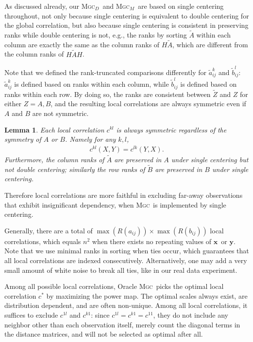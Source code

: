 \documentclass[11pt]{article}
\providecommand{\sct}[1]{{\normalfont\textsc{#1}}}
\providecommand{\mt}[1]{\widetilde{#1}}
\providecommand{\mb}[1]{\boldsymbol{#1}}
\newcommand{\G}{c}
\newcommand{\Mgc}{\sct{Mgc}}
\newcommand{\Mgcd}{\sct{Mgc$_D$}}
\newcommand{\Mgcm}{\sct{Mgc$_M$}}
\newcommand{\mbx}{\ensuremath{\mb{x}}}
\newcommand{\mby}{\ensuremath{\mb{y}}}
\newtheorem{lem}{Lemma}
\begin{document}
As discussed already, our \Mgcd~and \Mgcm~are based on single centering throughout, not only because single centering is equivalent to double centering for the global correlation, but also because single centering is consistent in preserving ranks while double centering is not, e.g., the ranks by sorting $\tilde{A}$ within each column are exactly the same as the column ranks of $H\tilde{A}$, which are different from the column ranks of $H\tilde{A}H$. 

Note that we defined the rank-truncated comparisons differently for $\mt{a}_{ij}^k$ and $\mt{b}_{ij}^l$: $\mt{a}_{ij}^k$ is defined based on ranks within each column, while $\mt{b}_{ij}^l$ is defined based on ranks within each row. By doing so, the ranks are consistent between $\tilde{Z}$ and $Z$ for either $Z=A,B$, and the resulting local correlations are always symmetric even if $A$ and $B$ are not symmetric.

\begin{lem}
Each local correlation $\G^{kl}$ is always symmetric regardless of the symmetry of $A$ or $B$. Namely for any $k,l$, 
\begin{align*}
\G^{kl}(X,Y)=\G^{lk}(Y,X).
\end{align*}
Furthermore, the column ranks of $\tilde{A}$ are preserved in $A$ under single centering but not double centering; similarly the row ranks of $\tilde{B}$ are preserved in $B$ under single centering.
\end{lem}
Therefore local correlations are more faithful in excluding far-away observations that exhibit insignificant dependency, when \Mgc~is implemented by single centering.

Generally, there are a total of $\max(R(a_{ij})) \times \max(R(b_{ij}))$ local correlations, which equals $n^2$ when there exists no repeating values of \mbx~or \mby. Note that we use minimal ranks in sorting when ties occur, which guarantees that all local correlations are indexed consecutively. Alternatively, one may add a very small amount of white noise to break all ties, like in our real data experiment.

Among all possible local correlations, Oracle \Mgc~picks the optimal local correlation $\G^{*}$ by maximizing the power map. The optimal scales always exist,  are distribution dependent, and are often non-unique. Among all local correlations, it suffices to exclude $\G^{1l}$ and $\G^{k1}$: since $\G^{1l}=\G^{k1}=\G^{11}$, they do not include any neighbor other than each observation itself, merely count the diagonal terms in the distance matrices, and will not be selected as optimal after all.
\end{document}
